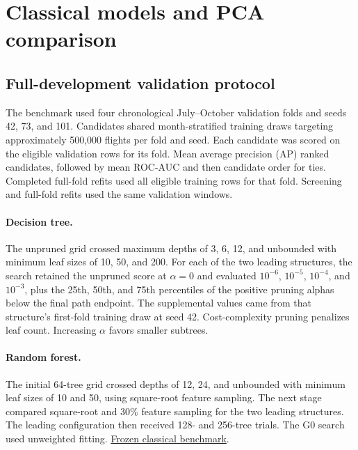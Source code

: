 \documentclass{article}
\begin{document}
\section{Classical models and PCA comparison}
\subsection{Full-development validation protocol}
The benchmark used four chronological July--October validation folds and
seeds 42, 73, and 101. Candidates shared month-stratified training draws
targeting approximately 500,000 flights per fold and seed. Each candidate
was scored on the eligible validation rows for its fold. Mean average
precision (AP) ranked candidates, followed by mean ROC-AUC and then candidate
order for ties. Completed full-fold refits used all eligible training rows
for that fold. Screening and full-fold refits used the same validation
windows.

\paragraph{Decision tree.}
The unpruned grid crossed maximum depths of 3, 6, 12, and unbounded with
minimum leaf sizes of 10, 50, and 200. For each of the two leading structures,
the search retained the unpruned score at $\alpha=0$ and evaluated
$10^{-6}$, $10^{-5}$, $10^{-4}$, and $10^{-3}$, plus the 25th, 50th, and
75th percentiles of the positive pruning alphas below the final path endpoint.
The supplemental values came from that structure's first-fold training draw
at seed 42. Cost-complexity pruning penalizes leaf count. Increasing
$\alpha$ favors smaller subtrees.

\paragraph{Random forest.}
The initial 64-tree grid crossed depths of 12, 24, and unbounded with minimum
leaf sizes of 10 and 50, using square-root feature sampling. The next stage
compared square-root and 30\% feature sampling for the two leading
structures. The leading configuration then received 128- and 256-tree
trials. The G0 search used unweighted fitting.
\href{https://github.com/oki-dokii/Flight-Departure-Delay-Prediction-/blob/0c419696e29dfe90be903ddb77c2a51028be41e1/src/phase_b_classical.py}{Frozen classical benchmark}.
\end{document}

